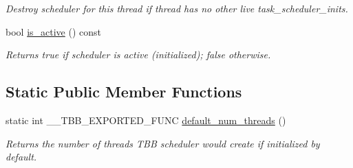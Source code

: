 \begin{DoxyCompactItemize}
\begin{DoxyCompactList}\small\item\em Destroy scheduler for this thread if thread has no other live task\+\_\+scheduler\+\_\+inits. \end{DoxyCompactList}\item 
\hypertarget{classtbb_1_1task__scheduler__init_aed5505d7fed9d5493676aa15c176512c}{}bool \hyperlink{classtbb_1_1task__scheduler__init_aed5505d7fed9d5493676aa15c176512c}{is\+\_\+active} () const \label{classtbb_1_1task__scheduler__init_aed5505d7fed9d5493676aa15c176512c}

\begin{DoxyCompactList}\small\item\em Returns true if scheduler is active (initialized); false otherwise. \end{DoxyCompactList}\end{DoxyCompactItemize}
\subsection*{Static Public Member Functions}
\begin{DoxyCompactItemize}
\item 
static int \+\_\+\+\_\+\+T\+B\+B\+\_\+\+E\+X\+P\+O\+R\+T\+E\+D\+\_\+\+F\+U\+N\+C \hyperlink{classtbb_1_1task__scheduler__init_a7177e341a66163cbed948013dbe86c56}{default\+\_\+num\+\_\+threads} ()
\begin{DoxyCompactList}\small\item\em Returns the number of threads T\+B\+B scheduler would create if initialized by default. \end{DoxyCompactList}\end{DoxyCompactItemize}
